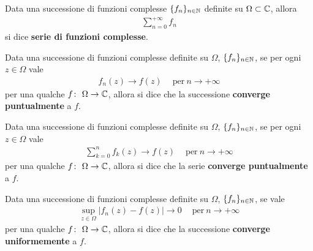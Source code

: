 \begin{definition}
	\label{defn:serie-di-funzioni-complesse}
	Data una successione di funzioni complesse $\{f_n\}_{n\in\mathbb{N}}$ definite su $\Omega\subset\mathbb{C}$, allora 
	\begin{equation}
	\begin{aligned}
		\sum_{n=0}^{+\infty} f_n 
	\end{aligned}
	\end{equation}
	si dice \textbf{serie di funzioni complesse}.
\end{definition}

\begin{definition}
	\label{defn:convergenza-puntuale-successione}
	Data una successione di funzioni complesse definite su $\Omega$, $\{f_n\}_{n\in\mathbb{N}}$, se per ogni $z \in \Omega$ vale 
	\begin{equation}
	\begin{aligned}
		f_n(z) \to f(z) \quad\ \text{per}\ n \to +\infty
	\end{aligned}
	\end{equation}
	per una qualche $f \colon\ \Omega \rightarrow \mathbb{C}$, allora si dice che la successione \textbf{converge puntualmente} a $f$.
\end{definition}

\begin{definition}
	\label{defn:convergenza-puntuale-serie}
	Data una successione di funzioni complesse definite su $\Omega$, $\{f_n\}_{n\in\mathbb{N}}$, se per ogni $z \in \Omega$ vale 
	\begin{equation}
	\begin{aligned}
		\sum^{n}_{k=0} f_k(z) \to f(z) \quad\ \text{per}\ n \to +\infty
	\end{aligned}
	\end{equation}
	per una qualche $f \colon\ \Omega \rightarrow \mathbb{C}$, allora si dice che la serie \textbf{converge puntualmente} a $f$.
\end{definition}

\begin{definition}
	\label{defn:convergenza-uniforme-successione}
	Data una successione di funzioni complesse definite su $\Omega$, $\{f_n\}_{n\in\mathbb{N}}$, se vale 
	\begin{equation}
	\begin{aligned}
		\sup_{z \in \Omega} |f_n(z) - f(z)| \to 0 \quad\ \text{per}\ n \to +\infty
	\end{aligned}
	\end{equation}
	per una qualche $f \colon\ \Omega \rightarrow \mathbb{C}$, allora si dice che la successione \textbf{converge uniformemente} a $f$.
\end{definition}

